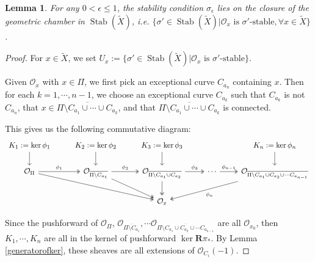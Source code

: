 \documentclass[12pt]{amsart}
\newtheorem{lemma}[theorem]{Lemma}
\theoremstyle{definition}
\DeclareMathOperator{\Stab}{Stab}
\begin{document}
\begin{lemma}\label{geochamber}
For any $0<\epsilon\leq1$, the stability condition $\sigma_\epsilon$ lies on the closure of the geometric chamber in $\Stab(\widetilde{X})$, i.e. $\{\sigma' \in \Stab(\widetilde{X})  |  \mathcal{O}_x \text{ is } \sigma' \text{-stable},\forall x \in \widetilde{X} \}$.
\end{lemma}
\begin{proof}
For $x \in \widetilde{X}$, we set $U_x:=\{\sigma' \in \Stab(\widetilde{X})  |  \mathcal{O}_x \text{ is } \sigma' \text{-stable} \}$.

Given $\mathcal{O}_x$ with $x \in \Pi$,
we first pick an exceptional curve $C_{a_n}$ containing $x$.
Then for each $k=1, \cdots, n-1$,
we choose an exceptional curve $C_{a_k}$ such that $C_{a_k}$ is not $C_{a_n}$, that $x \in \overline{\Pi \setminus C_{a_1}\cup\cdots \cup C_{a_k}}$, and that $\overline{\Pi \setminus C_{a_1}\cup\cdots \cup C_{a_k}}$ is connected.

This gives us the following commutative diagram:
\[
\begin{tikzcd}
K_1:=\ker \phi_1 \arrow[d]                                              & K_2:=\ker \phi_2 \arrow[d]                                                                         & K_3:=\ker \phi_3 \arrow[d]                                                                                     &                                           & K_n:=\ker \phi_n \arrow[d]                                                                                   \\
\mathcal{O}_{\Pi} \arrow[r, "\phi_1", two heads] \arrow[rrd, two heads] & \mathcal{O}_{\overline{\Pi\setminus C_{a_1}}} \arrow[r, "\phi_2", two heads] \arrow[rd, two heads] & \mathcal{O}_{\overline{\Pi\setminus C_{a_1}\cup C_{a_2} }} \arrow[r, "\phi_3", two heads] \arrow[d, two heads] & \cdots \arrow[r, "\phi_{n-1}", two heads] & \mathcal{O}_{\overline{\Pi\setminus C_{a_1}\cup C_{a_2}\cup\cdots C_{a_{n-1}}}} \arrow[lld, "\phi_n", two heads] \\
   &               & \mathcal{O}_x               &       &            
\end{tikzcd}
\]

Since the pushforward of $\mathcal{O}_\Pi$, $\mathcal{O}_{\overline{\Pi\setminus C_{a_1}}}, \cdots \mathcal{O}_{\overline{\Pi\setminus C_{a_1}\cup C_{a_2}\cup\cdots C_{a_{n-1}}}}$ are all $\mathcal{O}_{x_0}$,
then $K_1, 
 \cdots, 
K_n$ are all in the kernel of pushforward $\ker \mathbf{R}\pi_\ast$.
By Lemma \ref{generatorofker}, these sheaves are all extensions of $\mathcal{O}_{C_i}(-1)$.


\end{proof}
\end{document}
